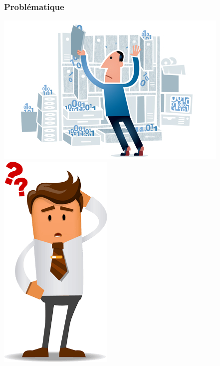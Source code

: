 \documentclass{beamer}
\begin{document}
\begin{frame}
    \frametitle{Problématique}
    \includegraphics[width=.6\textwidth]{../figures/datamanagement-issues.jpg}
    \includegraphics[width=.32\textwidth]{../figures/question.png}
\end{frame}
\end{document}

